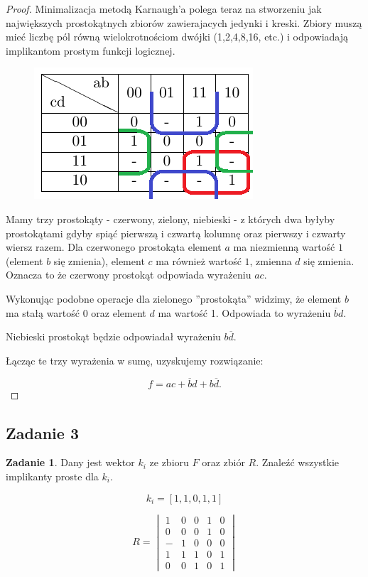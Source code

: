 \documentclass[11pt]{article}
\theoremstyle{definition}
\newtheorem{zadanie}{Zadanie}
\begin{document}
\begin{proof}
Minimalizacja metodą Karnaugh'a polega teraz na stworzeniu jak największych prostokątnych zbiorów zawierajacych jedynki i kreski. Zbiory muszą mieć liczbę pól równą wielokrotnościom dwójki (1,2,4,8,16, etc.) i odpowiadają implikantom prostym funkcji logicznej.

\begin{figure}[H]
\centering
\includegraphics[width=0.5\linewidth]{tab_1.png}
\end{figure}


Mamy trzy prostokąty - czerwony, zielony, niebieski - z których dwa byłyby prostokątami gdyby spiąć pierwszą i czwartą kolumnę oraz pierwszy i czwarty wiersz razem. Dla czerwonego prostokąta element $a$ ma niezmienną wartość $1$ (element $b$ się zmienia), element $c$ ma również wartość $1$, zmienna $d$ się zmienia. Oznacza to że czerwony prostokąt odpowiada wyrażeniu $ac$.

Wykonując podobne operacje dla zielonego ''prostokąta'' widzimy, że element $b$ ma stałą wartość $0$ oraz element $d$ ma wartość 1. Odpowiada to wyrażeniu $\overline bd$.

Niebieski prostokąt będzie odpowiadał wyrażeniu $b\overline d$.

Łącząc te trzy wyrażenia w sumę, uzyskujemy rozwiązanie:

$$f = ac + \overline bd + b\overline d.$$
\end{proof}

\subsection{Zadanie 3}
\begin{zadanie}
Dany jest wektor $k_i$ ze zbioru $F$ oraz zbiór $R$. Znaleźć wszystkie implikanty proste dla $k_i$.

$$k_i = [1, 1, 0, 1, 1]$$

$$R = 
\begin{vmatrix}
1&0&0&1&0 \\
0&0&0&1&0 \\
-&1&0&0&0 \\
1&1&1&0&1 \\
0&0&1&0&1
\end{vmatrix}
$$
\end{zadanie}
\end{document}
